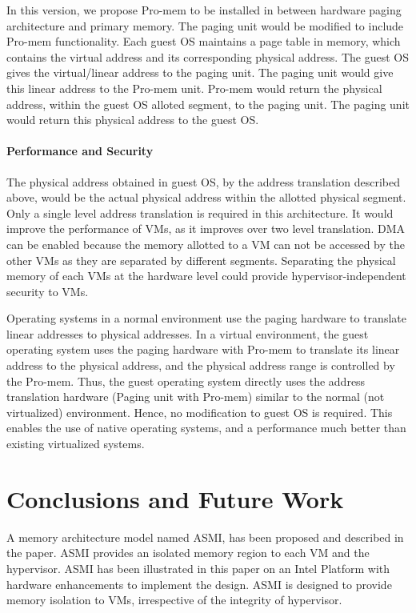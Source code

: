 \documentclass[a4paper,10pt,twocolumn]{article}
\begin{document}
   In this version, we propose Pro-mem to be installed in between hardware paging architecture and primary memory. The paging unit would  be modified to include Pro-mem functionality. Each guest OS maintains a page table in memory, which contains the virtual address and its corresponding physical address. The guest OS gives the virtual/linear address to the paging unit. The paging unit would give this linear address to the Pro-mem unit. Pro-mem would return the physical address, within the guest OS alloted segment, to the paging unit. The paging unit would return this physical address to the guest OS.

  \paragraph{Performance and Security}
  The physical address obtained in guest OS, by the address translation described above, would be the actual physical address within the allotted physical segment. Only a single level address translation is required in this architecture. It would improve the performance of VMs, as it improves over two level translation. DMA can be enabled because the memory allotted to a VM can not be accessed by the other VMs as they are separated by different segments.  Separating the physical memory of each VMs at the hardware level could provide  hypervisor-independent security to VMs.

  Operating systems in a normal environment use the paging hardware to translate  linear addresses to  physical addresses. In a virtual environment, the guest operating system uses the paging hardware with Pro-mem to translate its linear address to the  physical address, and the physical address range is controlled by the Pro-mem. Thus, the guest operating system directly uses the address translation hardware (Paging unit with Pro-mem) similar to the normal (not virtualized) environment. Hence, no modification to guest OS is required. This enables the use of native operating systems, and a performance much better than existing virtualized systems.

  \section{Conclusions and Future Work} \label{conclusion}

    A memory architecture model named ASMI, has been proposed and described in the paper.   ASMI provides an isolated memory region to each VM and the hypervisor. ASMI has been illustrated in this paper on an Intel Platform with hardware enhancements to implement the design.  ASMI  is designed to provide memory isolation to VMs, irrespective of the integrity of hypervisor.
\end{document}
